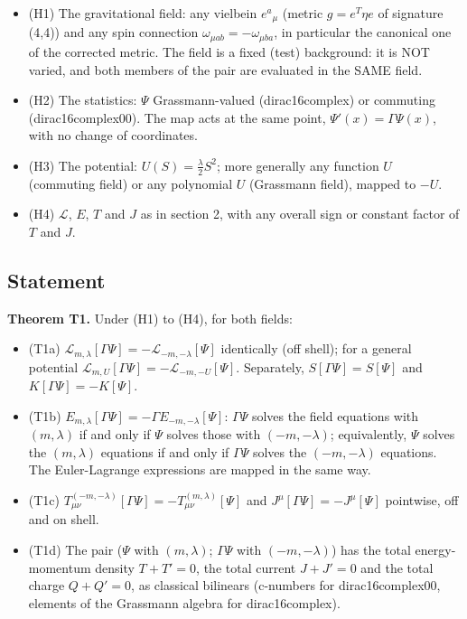 \documentclass[11pt]{article}
\begin{document}
\begin{itemize}
\item (H1) The gravitational field: any vielbein $e^a{}_\mu$ (metric $g = e^T\eta e$ of signature (4,4)) and any spin connection $\omega_{\mu ab} = -\omega_{\mu ba}$, in particular the canonical one of the corrected metric. The field is a fixed (test) background: it is NOT varied, and both members of the pair are evaluated in the SAME field.
\item (H2) The statistics: $\Psi$ Grassmann-valued (dirac16complex) or commuting (dirac16complex00). The map acts at the same point, $\Psi'(x) = \Gamma\Psi(x)$, with no change of coordinates.
\item (H3) The potential: $U(S) = \frac{\lambda}{2}S^2$; more generally any function $U$ (commuting field) or any polynomial $U$ (Grassmann field), mapped to $-U$.
\item (H4) $\mathcal{L}$, $E$, $T$ and $J$ as in section 2, with any overall sign or constant factor of $T$ and $J$.
\end{itemize}

\subsection{Statement}

\textbf{Theorem T1.} Under (H1) to (H4), for both fields:

\begin{itemize}
\item (T1a) $\mathcal{L}_{m,\lambda}[\Gamma\Psi] = -\mathcal{L}_{-m,-\lambda}[\Psi]$ identically (off shell); for a general potential $\mathcal{L}_{m,U}[\Gamma\Psi] = -\mathcal{L}_{-m,-U}[\Psi]$. Separately, $S[\Gamma\Psi] = S[\Psi]$ and $K[\Gamma\Psi] = -K[\Psi]$.
\item (T1b) $E_{m,\lambda}[\Gamma\Psi] = -\Gamma E_{-m,-\lambda}[\Psi]$: $\Gamma\Psi$ solves the field equations with $(m,\lambda)$ if and only if $\Psi$ solves those with $(-m,-\lambda)$; equivalently, $\Psi$ solves the $(m,\lambda)$ equations if and only if $\Gamma\Psi$ solves the $(-m,-\lambda)$ equations. The Euler-Lagrange expressions are mapped in the same way.
\item (T1c) $T^{(-m,-\lambda)}_{\mu\nu}[\Gamma\Psi] = -T^{(m,\lambda)}_{\mu\nu}[\Psi]$ and $J^\mu[\Gamma\Psi] = -J^\mu[\Psi]$ pointwise, off and on shell.
\item (T1d) The pair ($\Psi$ with $(m,\lambda)$; $\Gamma\Psi$ with $(-m,-\lambda)$) has the total energy-momentum density $T + T' = 0$, the total current $J + J' = 0$ and the total charge $Q + Q' = 0$, as classical bilinears (c-numbers for dirac16complex00, elements of the Grassmann algebra for dirac16complex).
\end{itemize}
\end{document}
